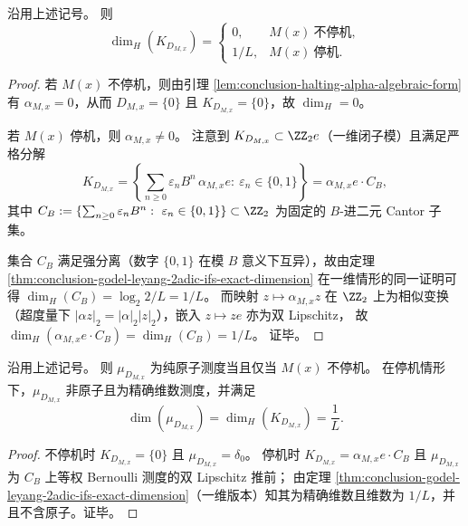 \begin{theorem}\label{thm:conclusion-halting-dimension-binary-law}
沿用上述记号。
则
\[
\dim_H(K_{D_{M,x}})=
\begin{cases}
0,& M(x)\ \text{不停机},\\[2pt]
1/L,& M(x)\ \text{停机}.
\end{cases}
\]
\end{theorem}

\begin{proof}
若 \(M(x)\) 不停机，则由引理 \ref{lem:conclusion-halting-alpha-algebraic-form} 有 \(\alpha_{M,x}=0\)，从而
\(
D_{M,x}=\{0\}
\) 且 \(K_{D_{M,x}}=\{0\}\)，故 \(\dim_H=0\)。
\par
若 \(M(x)\) 停机，则 \(\alpha_{M,x}\neq 0\)。
注意到 \(K_{D_{M,x}}\subset \ZZ_2 e\)（一维闭子模）且满足严格分解
\[
K_{D_{M,x}}
=\left\{\sum_{n\ge 0}\varepsilon_n B^n\,\alpha_{M,x}e:\ \varepsilon_n\in\{0,1\}\right\}
=\alpha_{M,x}e\cdot C_B,
\]
其中
\(
C_B:=\{\sum_{n\ge 0}\varepsilon_n B^n:\ \varepsilon_n\in\{0,1\}\}\subset \ZZ_2
\)
为固定的 \(B\)-进二元 Cantor 子集。
\par
集合 \(C_B\) 满足强分离（数字 \(\{0,1\}\) 在模 \(B\) 意义下互异），故由定理 \ref{thm:conclusion-godel-leyang-2adic-ifs-exact-dimension} 在一维情形的同一证明可得
\(
\dim_H(C_B)=\log_2 2/L=1/L
\)。
而映射 \(z\mapsto \alpha_{M,x}z\) 在 \(\ZZ_2\) 上为相似变换（超度量下 \(|\alpha z|_2=|\alpha|_2|z|_2\)），嵌入 \(z\mapsto ze\) 亦为双 Lipschitz，
故 \(\dim_H(\alpha_{M,x}e\cdot C_B)=\dim_H(C_B)=1/L\)。
证毕。
\end{proof}

\begin{corollary}\label{cor:conclusion-halting-measure-atomic-branch}
沿用上述记号。
则 \(\mu_{D_{M,x}}\) 为纯原子测度当且仅当 \(M(x)\) 不停机。
在停机情形下，\(\mu_{D_{M,x}}\) 非原子且为精确维数测度，并满足
\[
\dim(\mu_{D_{M,x}})=\dim_H(K_{D_{M,x}})=\frac{1}{L}.
\]
\end{corollary}

\begin{proof}
不停机时 \(K_{D_{M,x}}=\{0\}\) 且 \(\mu_{D_{M,x}}=\delta_0\)。
停机时 \(K_{D_{M,x}}=\alpha_{M,x}e\cdot C_B\) 且 \(\mu_{D_{M,x}}\) 为 \(C_B\) 上等权 Bernoulli 测度的双 Lipschitz 推前；
由定理 \ref{thm:conclusion-godel-leyang-2adic-ifs-exact-dimension}（一维版本）知其为精确维数且维数为 \(1/L\)，并且不含原子。证毕。
\end{proof}

